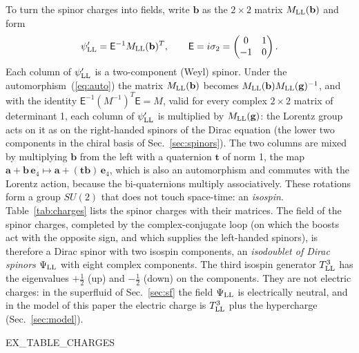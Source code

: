 \documentclass[aps,prd,twocolumn,superscriptaddress,nofootinbib,floatfix,longbibliography]{revtex4-2}
\newcommand{\LL}{{\rm LL}}
\newcommand{\e}[1]{\mathbf e_{#1}}
\begin{document}
To turn the spinor charges into fields, write $\mathbf b$ as the $2\times2$ matrix $M_\LL(\mathbf b)$ and form
\begin{equation}
\psi'_\LL=\mathsf E^{-1}M_\LL(\mathbf b)^T,\qquad \mathsf E=i\sigma_2=\begin{pmatrix}0&1\\-1&0\end{pmatrix}.
\label{eq:psiprime}
\end{equation}
Each column of $\psi'_\LL$ is a two-component (Weyl) spinor. Under the automorphism~(\ref{eq:auto}) the matrix
$M_\LL(\mathbf b)$ becomes $M_\LL(\mathbf b)M_\LL(\mathbf g)^{-1}$, and with the identity $\mathsf E^{-1}(M^{-1})^T\mathsf
E=M$, valid for every complex $2\times2$ matrix of determinant 1, each column of $\psi'_\LL$ is multiplied by
$M_\LL(\mathbf g)$: the Lorentz group acts on it as on the right-handed spinors of the Dirac equation (the lower two
components in the chiral basis of Sec.~\ref{sec:spinors}). The two columns are mixed by multiplying $\mathbf b$ from the
left with a quaternion $\mathbf t$ of norm 1, the map $\mathbf a+\mathbf b\,\e4\mapsto\mathbf a+(\mathbf t\mathbf
b)\,\e4$, which is also an automorphism and commutes with the Lorentz action, because the bi-quaternions multiply
associatively. These rotations form a group $SU(2)$ that does not touch space-time: an \emph{isospin}.
Table~\ref{tab:charges} lists the spinor charges with their matrices. The field of the spinor charges, completed by the
complex-conjugate loop (on which the boosts act with the opposite sign, and which supplies the left-handed spinors), is
therefore a Dirac spinor with two isospin components, an \emph{isodoublet of Dirac spinors} $\Psi_\LL$ with eight complex
components. The third isospin generator $T^3_\LL$ has the eigenvalues $+\frac12$ (up) and $-\frac12$ (down) on the
components. They are not electric charges: in the superfluid of Sec.~\ref{sec:sf} the field $\Psi_\LL$ is electrically
neutral, and in the model of this paper the electric charge is $T^3_\LL$ plus the hypercharge (Sec.~\ref{sec:model}).

\begin{table}[t]
\caption{The eight spinor charges $\mathbf b\,\e4$: the matrix $M_\LL(\mathbf b)$ of Eq.~(\ref{eq:Mmap}), the
matrix $\psi'_\LL$ of Eq.~(\ref{eq:psiprime}), and its two columns, the isospin-up and the isospin-down Weyl spinor.}
\label{tab:charges}
\begin{ruledtabular}
{{EX_TABLE_CHARGES}}
\end{ruledtabular}
\end{table}
\end{document}
